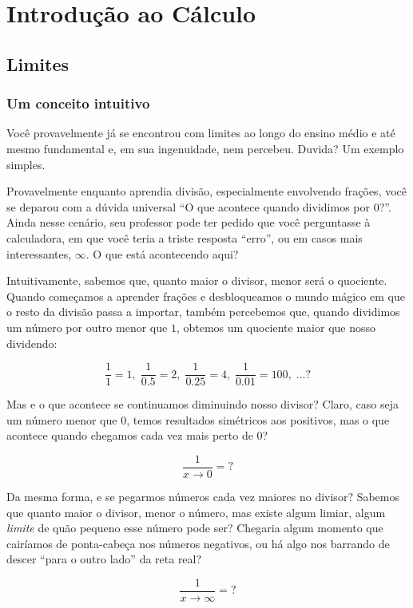 \documentclass[
  portuguese,
  letterpaper,
  DIV=11,
  numbers=noendperiod]{scrreport}
\begin{document}
\part{Introdução ao Cálculo}

\chapter{Limites}\label{limites}

\section{Um conceito intuitivo}\label{um-conceito-intuitivo}

Você provavelmente já se encontrou com limites ao longo do ensino médio
e até mesmo fundamental e, em sua ingenuidade, nem percebeu. Duvida? Um
exemplo simples.

Provavelmente enquanto aprendia divisão, especialmente envolvendo
frações, você se deparou com a dúvida universal ``O que acontece quando
dividimos por \(0\)?''. Ainda nesse cenário, seu professor pode ter
pedido que você perguntasse à calculadora, em que você teria a triste
resposta ``erro'', ou em casos mais interessantes, \(\infty\). O que
está acontecendo aqui?

Intuitivamente, sabemos que, quanto maior o divisor, menor será o
quociente. Quando começamos a aprender frações e desbloqueamos o mundo
mágico em que o resto da divisão passa a importar, também percebemos
que, quando dividimos um número por outro menor que \(1\), obtemos um
quociente maior que nosso dividendo:

\[
\frac{1}{1} = 1,\; \frac{1}{0.5} = 2,\; \frac{1}{0.25} = 4,\; \frac{1}{0.01} = 100,\; \dots ?
\]

Mas e o que acontece se continuamos diminuindo nosso divisor? Claro,
caso seja um número menor que \(0\), temos resultados simétricos aos
positivos, mas o que acontece quando chegamos cada vez mais perto de
\(0\)?

\[
\frac{1}{x\rightarrow 0} = ?
\]

Da mesma forma, e se pegarmos números cada vez maiores no divisor?
Sabemos que quanto maior o divisor, menor o número, mas existe algum
limiar, algum \emph{limite} de quão pequeno esse número pode ser?
Chegaria algum momento que cairíamos de ponta-cabeça nos números
negativos, ou há algo nos barrando de descer ``para o outro lado'' da
reta real?

\[
\frac{1}{x\rightarrow \infty} = ?
\]
\end{document}
